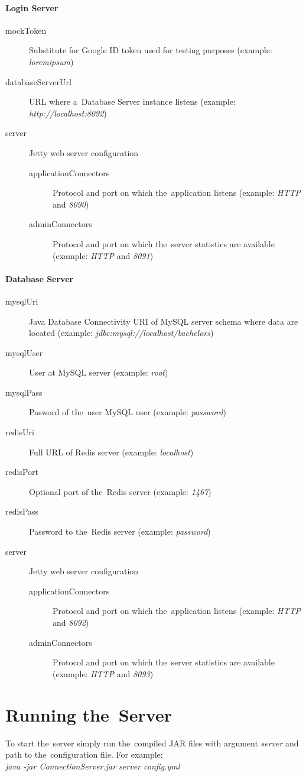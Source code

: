 \paragraph*{Login Server}
\begin{description}
	\item[mockToken] Substitute for Google ID token used for testing purposes (example: \textit{loremipsum})
	\item[databaseServerUrl] URL where a~Database Server instance listens (example: \textit{http://localhost:8092})
	\item[server] Jetty web server configuration
	\begin{description}
		\item[applicationConnectors] Protocol and port on which the~application listens (example: \textit{HTTP} and \textit{8090})
		\item[adminConnectors] Protocol and port on which the~server statistics are available  (example: \textit{HTTP} and \textit{8091})
	\end{description}
\end{description}

\paragraph*{Database Server}
\begin{description}
	\item[mysqlUri] Java Database Connectivity URI of MySQL server schema where data are located (example: \textit{jdbc:mysql://localhost/bachelors})
	\item[mysqlUser] User at MySQL server (example: \textit{root})
	\item[mysqlPass] Pasword of the~user MySQL user (example: \textit{password})
	\item[redisUri] Full URL of Redis server (example: \textit{localhost})
	\item[redisPort] Optional port of the~Redis server (example: \textit{1467})
	\item[redisPass] Password to the~Redis server (example: \textit{password})
	\item[server] Jetty web server configuration
	\begin{description}
		\item[applicationConnectors] Protocol and port on which the~application listens (example: \textit{HTTP} and \textit{8092})
		\item[adminConnectors] Protocol and port on which the~server statistics are available  (example: \textit{HTTP} and \textit{8093})
	\end{description}
\end{description}


\section{Running the~Server}
To start the~server simply run the~compiled JAR files with argument \textit{server} and path to the~configuration file. For example:\\
\textit{java -jar ConnectionServer.jar server config.yml}

